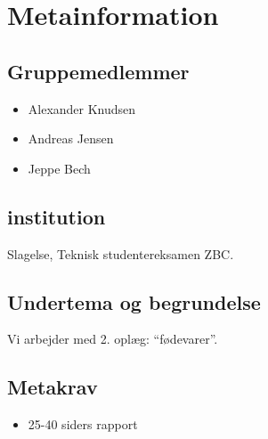 \section{Metainformation}
\subsection{Gruppemedlemmer}
\begin{itemize}
  \item Alexander Knudsen
  \item Andreas Jensen
  \item Jeppe Bech
\end{itemize}
\subsection{institution}
Slagelse, Teknisk studentereksamen ZBC.
\subsection{Undertema og begrundelse}
Vi arbejder med 2. oplæg: ``fødevarer''.
\subsection{Metakrav}
\begin{itemize}
  \item 25-40 siders rapport
\end{itemize}
